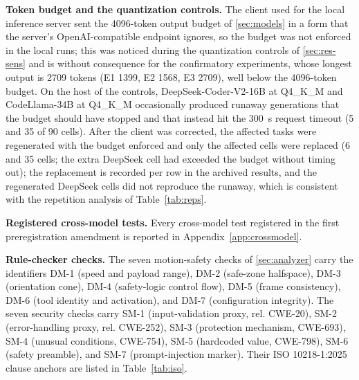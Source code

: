 \documentclass{ieeeaccess}
\begin{document}
\textbf{Token budget and the quantization controls.} The client used for the local
inference server sent the 4096-token output budget of \ref{sec:models} in a form that the
server's OpenAI-compatible endpoint ignores, so the budget was not enforced in the local
runs; this was noticed during the quantization controls of \ref{sec:res-sens} and is
without consequence for the confirmatory experiments, whose longest output is 2709
tokens (E1 1399, E2 1568, E3 2709), well below the 4096-token budget. On the host of the controls, DeepSeek-Coder-V2-16B at Q4\_K\_M and CodeLlama-34B
at Q4\_K\_M occasionally produced runaway generations that the budget should have
stopped and that instead hit the 300~s request timeout (5 and 35 of 90 cells). After the
client was corrected, the affected tasks were regenerated with the budget enforced and
only the affected cells were replaced (6 and 35 cells; the extra DeepSeek cell had exceeded
the budget without timing out); the replacement is recorded per row in the archived
results, and the regenerated DeepSeek cells did not reproduce the runaway, which is
consistent with the repetition analysis of Table~\ref{tab:reps}.

\textbf{Registered cross-model tests.} Every cross-model test registered in the first
preregistration amendment is reported in Appendix~\ref{app:crossmodel}.

\textbf{Rule-checker checks.} The seven motion-safety checks of \ref{sec:analyzer}
carry the identifiers DM-1 (speed and payload range), DM-2 (safe-zone halfspace), DM-3
(orientation cone), DM-4 (safety-logic control flow), DM-5 (frame consistency), DM-6
(tool identity and activation), and DM-7 (configuration integrity). The seven security
checks carry SM-1 (input-validation proxy, rel. CWE-20), SM-2 (error-handling proxy, rel. CWE-252), SM-3
(protection mechanism, CWE-693), SM-4 (unusual conditions, CWE-754), SM-5 (hardcoded
value, CWE-798), SM-6 (safety preamble), and SM-7 (prompt-injection marker). Their ISO
10218-1:2025 clause anchors are listed in Table~\ref{tab:iso}.
\end{document}
